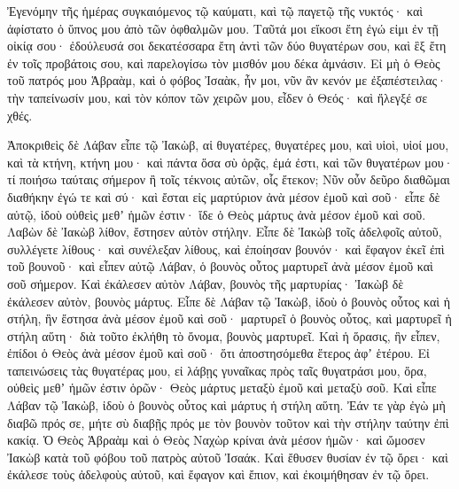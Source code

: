 {Ἐγενόμην τῆς ἡμέρας συγκαιόμενος τῷ καύματι, καὶ τῷ παγετῷ τῆς νυκτός· καὶ ἀφίστατο ὁ ὕπνος μου ἀπὸ τῶν ὀφθαλμῶν μου.
Ταῦτά μοι εἴκοσι ἔτη ἐγώ εἰμι ἐν τῇ οἰκίᾳ σου· ἐδούλευσά σοι δεκατέσσαρα ἔτη ἀντὶ τῶν δύο θυγατέρων σου, καὶ ἓξ ἔτη ἐν τοῖς προβάτοις σου, καὶ παρελογίσω τὸν μισθόν μου δέκα ἀμνάσιν.
Εἰ μὴ ὁ Θεὸς τοῦ πατρός μου Ἁβραὰμ, καὶ ὁ φόβος Ἰσαὰκ, ἦν μοι, νῦν ἂν κενόν με ἐξαπέστειλας· τὴν ταπείνωσίν μου, καὶ τὸν κόπον τῶν χειρῶν μου, εἶδεν ὁ Θεός· καὶ ἤλεγξέ σε χθές.
\par }{\PP {}Ἀποκριθεὶς δὲ Λάβαν εἶπε τῷ Ἰακὼβ, αἱ θυγατέρες, θυγατέρες μου, καὶ υἱοὶ, υἱοί μου, καὶ τὰ κτήνη, κτήνη μου· καὶ πάντα ὅσα σὺ ὁρᾷς, ἐμά ἐστι, καὶ τῶν θυγατέρων μου· τί ποιήσω ταύταις σήμερον ἢ τοῖς τέκνοις αὐτῶν, οἷς ἔτεκον;
Νῦν οὖν δεῦρο διαθῶμαι διαθήκην ἐγώ τε καὶ σύ· καὶ ἔσται εἰς μαρτύριον ἀνὰ μέσον ἐμοῦ καὶ σοῦ· εἶπε δὲ αὐτῷ, ἰδοὺ οὐθεὶς μεθʼ ἡμῶν ἐστιν· ἴδε ὁ Θεὸς μάρτυς ἀνὰ μέσον ἐμοῦ καὶ σοῦ.
Λαβὼν δὲ Ἰακὼβ λίθον, ἔστησεν αὐτὸν στήλην.
Εἶπε δὲ Ἰακὼβ τοῖς ἀδελφοῖς αὐτοῦ, συλλέγετε λίθους· καὶ συνέλεξαν λίθους, καὶ ἐποίησαν βουνόν· καὶ ἔφαγον ἐκεῖ ἐπὶ τοῦ βουνοῦ· καὶ εἶπεν αὐτῷ Λάβαν, ὁ βουνὸς οὗτος μαρτυρεῖ ἀνὰ μέσον ἐμοῦ καὶ σοῦ σήμερον.
Καὶ ἐκάλεσεν αὐτὸν Λάβαν, βουνὸς τῆς μαρτυρίας· Ἰακὼβ δὲ ἐκάλεσεν αὐτὸν, βουνὸς μάρτυς.
Εἶπε δὲ Λάβαν τῷ Ἰακὼβ, ἰδοὺ ὁ βουνὸς οὗτος καὶ ἡ στήλη, ἣν ἔστησα ἀνὰ μέσον ἐμοῦ καὶ σοῦ· μαρτυρεῖ ὁ βουνὸς οὗτος, καὶ μαρτυρεῖ ἡ στήλη αὕτη· διὰ τοῦτο ἐκλήθη τὸ ὄνομα, βουνὸς μαρτυρεῖ.
Καὶ ἡ ὅρασις, ἣν εἶπεν, ἐπίδοι ὁ Θεὸς ἀνὰ μέσον ἐμοῦ καὶ σοῦ· ὅτι ἀποστησόμεθα ἕτερος ἀφʼ ἑτέρου.
Εἰ ταπεινώσεις τὰς θυγατέρας μου, εἰ λάβῃς γυναῖκας πρὸς ταῖς θυγατράσι μου, ὅρα, οὐθεὶς μεθʼ ἡμῶν ἐστιν ὁρῶν· Θεὸς μάρτυς μεταξὺ ἐμοῦ καὶ μεταξὺ σοῦ.
Καὶ εἶπε Λάβαν τῷ Ἰακὼβ, ἰδοὺ ὁ βουνὸς οὗτος καὶ μάρτυς ἡ στήλη αὕτη.
Ἐάν τε γὰρ ἐγὼ μὴ διαβῶ πρός σε, μήτε σὺ διαβῇς πρός με τὸν βουνὸν τοῦτον καὶ τὴν στήλην ταύτην ἐπὶ κακίᾳ.
Ὁ Θεὸς Ἁβραὰμ καὶ ὁ Θεὸς Ναχὼρ κρίναι ἀνὰ μέσον ἡμῶν· καὶ ὤμοσεν Ἰακὼβ κατὰ τοῦ φόβου τοῦ πατρὸς αὐτοῦ Ἰσαάκ.
Καὶ ἔθυσεν θυσίαν ἐν τῷ ὄρει· καὶ ἐκάλεσε τοὺς ἀδελφοὺς αὐτοῦ, καὶ ἔφαγον καὶ ἔπιον, καὶ ἐκοιμήθησαν ἐν τῷ ὄρει.

}
